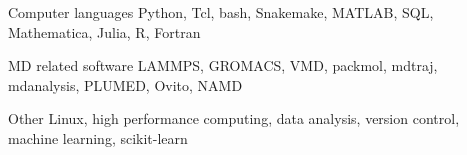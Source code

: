 
\begin{cvskills}
  
  \cvskill
    {Computer languages} %
    {Python, Tcl, bash, Snakemake, MATLAB, SQL, Mathematica, Julia, R, Fortran} %

  \cvskill
    {MD related software} %
    {LAMMPS, GROMACS, VMD, packmol, mdtraj, mdanalysis, PLUMED, Ovito, NAMD} %
  
  \cvskill
    {Other} %
    {Linux, high performance computing, data analysis, version control, machine learning, scikit-learn} %
    
\end{cvskills}
